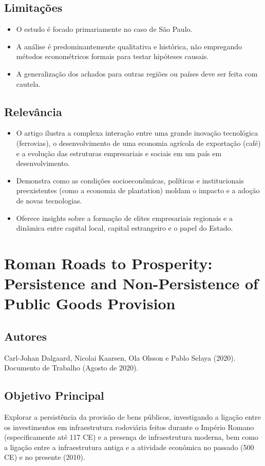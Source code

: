 \documentclass[12pt]{article}
\begin{document}
\subsection*{Limitações}
\begin{itemize}
    \item O estudo é focado primariamente no caso de São Paulo.
    \item A análise é predominantemente qualitativa e histórica, não empregando métodos econométricos formais para testar hipóteses causais.
    \item A generalização dos achados para outras regiões ou países deve ser feita com cautela.
\end{itemize}

\subsection*{Relevância}
\begin{itemize}
    \item O artigo ilustra a complexa interação entre uma grande inovação tecnológica (ferrovias), o desenvolvimento de uma economia agrícola de exportação (café) e a evolução das estruturas empresariais e sociais em um país em desenvolvimento.
    \item Demonstra como as condições socioeconômicas, políticas e institucionais preexistentes (como a economia de plantation) moldam o impacto e a adoção de novas tecnologias.
    \item Oferece insights sobre a formação de elites empresariais regionais e a dinâmica entre capital local, capital estrangeiro e o papel do Estado.
\end{itemize}

\newpage

\section{Roman Roads to Prosperity: Persistence and Non-Persistence of Public Goods Provision}

\subsection*{Autores}
Carl-Johan Dalgaard, Nicolai Kaarsen, Ola Olsson e Pablo Selaya (2020). Documento de Trabalho (Agosto de 2020).

\subsection*{Objetivo Principal}
Explorar a persistência da provisão de bens públicos, investigando a ligação entre os investimentos em infraestrutura rodoviária feitos durante o Império Romano (especificamente até 117 CE) e a presença de infraestrutura moderna, bem como a ligação entre a infraestrutura antiga e a atividade econômica no passado (500 CE) e no presente (2010).
\end{document}
